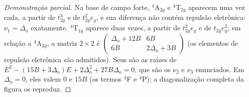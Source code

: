 \begin{proof}[Demonstração parcial]
Na base de campo forte, $^4$A$_{2g}$ e $^4$T$_{2g}$ aparecem uma vez cada, a partir de $t_{2g}^3$ e de $t_{2g}^2e_g$, e
sua diferença não contém repulsão eletrônica: $\nu_1 = \Delta_{\mathrm o}$ exatamente. $^4$T$_{1g}$ aparece
duas vezes, a partir de $t_{2g}^2e_g$ e de $t_{2g}e_g^2$; em relação a $^4$A$_{2g}$, a matriz $2\times2$ é
$\begin{pmatrix}\Delta_{\mathrm o} + 12B & 6B\\ 6B & 2\Delta_{\mathrm o} + 3B\end{pmatrix}$ (os elementos de repulsão eletrônica são admitidos).
Seus  são as raízes de $E^2 - (15B + 3\Delta_{\mathrm o})E + 2\Delta_{\mathrm o}^2 + 27B\Delta_{\mathrm o} = 0$, que são os
$\nu_2$ e $\nu_3$ enunciados. Em $\Delta_{\mathrm o} = 0$, eles valem 0 e $15B$ (os termos $^4$F e $^4$P); a
diagonalização completa da figura os reproduz.
\end{proof}

